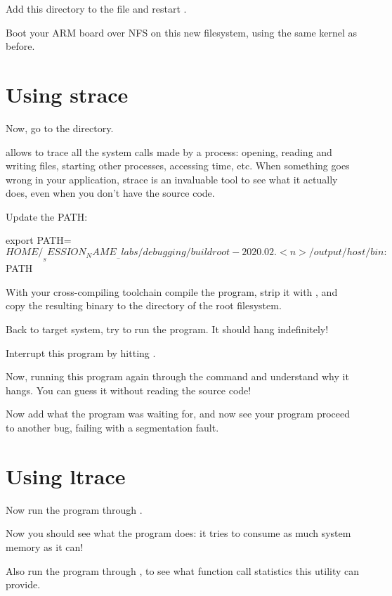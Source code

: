 Add this directory to the  file and restart
.

Boot your ARM board over NFS on this new filesystem, using the same
kernel as before.

\section{Using strace}

Now, go to the  directory.

 allows to trace all the system calls made by a process:
opening, reading and writing files, starting other processes,
accessing time, etc. When something goes wrong in your application,
strace is an invaluable tool to see what it actually does, even when
you don't have the source code.


Update the PATH:
\begin{terminalinput}
export PATH=$HOME/__SESSION_NAME__-labs/debugging/buildroot-2020.02.<n>/output/host/bin:$PATH
\end{terminalinput}

With your cross-compiling toolchain
compile the  program, strip it with
, and copy the resulting binary to the
 directory of the root filesystem.

Back to target system, try to run the 
program. It should hang indefinitely!

Interrupt this program by hitting \code{[Ctrl] [C]}.

Now, running this program again through the  command and
understand why it hangs. You can guess it without reading the source
code!

Now add what the program was waiting for, and now see your program
proceed to another bug, failing with a segmentation fault.

\section{Using ltrace}

Now run the program through .

Now you should see what the program does: it tries to consume as much
system memory as it can!

Also run the program through , to see what function call
statistics this utility can provide.

